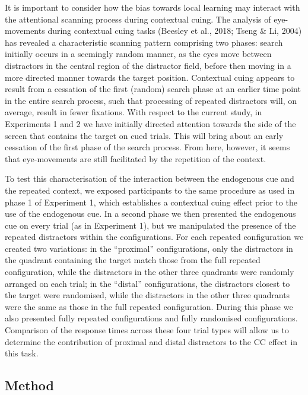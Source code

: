\documentclass[
  man,floatsintext]{apa7}
\begin{document}
It is important to consider how the bias towards local learning may interact with the attentional scanning process during contextual cuing. The analysis of eye-movements during contextual cuing tasks (Beesley et al., 2018; Tseng \& Li, 2004) has revealed a characteristic scanning pattern comprising two phases: search initially occurs in a seemingly random manner, as the eyes move between distractors in the central region of the distractor field, before then moving in a more directed manner towards the target position. Contextual cuing appears to result from a cessation of the first (random) search phase at an earlier time point in the entire search process, such that processing of repeated distractors will, on average, result in fewer fixations. With respect to the current study, in Experiments 1 and 2 we have initially directed attention towards the side of the screen that contains the target on cued trials. This will bring about an early cessation of the first phase of the search process. From here, however, it seems that eye-movements are still facilitated by the repetition of the context.

To test this characterisation of the interaction between the endogenous cue and the repeated context, we exposed participants to the same procedure as used in phase 1 of Experiment 1, which establishes a contextual cuing effect prior to the use of the endogenous cue. In a second phase we then presented the endogenous cue on every trial (as in Experiment 1), but we manipulated the presence of the repeated distractors within the configurations. For each repeated configuration we created two variations: in the ``proximal'' configurations, only the distractors in the quadrant containing the target match those from the full repeated configuration, while the distractors in the other three quadrants were randomly arranged on each trial; in the ``distal'' configurations, the distractors closest to the target were randomised, while the distractors in the other three quadrants were the same as those in the full repeated configuration. During this phase we also presented fully repeated configurations and fully randomised configurations. Comparison of the response times across these four trial types will allow us to determine the contribution of proximal and distal distractors to the CC effect in this task.

\hypertarget{method-2}{%
\subsection{Method}\label{method-2}}
\end{document}
